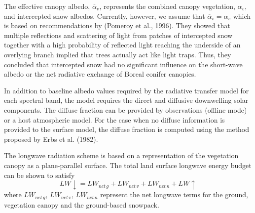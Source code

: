 The effective canopy albedo, ${\overline\alpha}_v$, represents the
combined canopy vegetation,  ${\alpha}_v$,
and intercepted snow albedos. Currently, however, we assume that
${\overline\alpha}_v={\alpha}_v$
%
which is based on
recommendations by 
(Pomeroy et al., 1996)\nocite{Pomeroy96}. 
They showed that multiple
reflections and scattering of light from patches of intercepted snow
together with a high probability of reflected light reaching the underside of an 
overlying branch
implied that trees actually act like light traps.
Thus, they concluded
that intercepted snow had no significant influence on the short-wave albedo
or the net radiative exchange of Boreal conifer canopies. 



In addition to baseline albedo values required by the radiative transfer
model for each spectral band,
the model requires the
direct and diffusive downwelling solar
components. The diffuse fraction can be provided by observations
(offline mode) or a host atmospheric
model. For the
case when no diffuse information is
provided to the surface model, the diffuse fraction is computed using
the method proposed by 
Erbs et al. (1982)\nocite{erbs_82}.
%

The longwave radiation scheme is based on a representation of the
vegetation canopy as a plane-parallel surface.
%
The total land surface longwave energy budget can be shown to satisfy
%
\begin{equation}
  \label{eq:meb_lwup_resid}
LW\downarrow = LW_{net\,g} + LW_{net\,v} + LW_{net\,n} + LW\uparrow 
%
\end{equation}
%
where $LW_{net\,g}$, $LW_{net\,v}$, $LW_{net\,n}$ represent the net longwave terms for the ground,
vegetation canopy and the ground-based snowpack.
%

